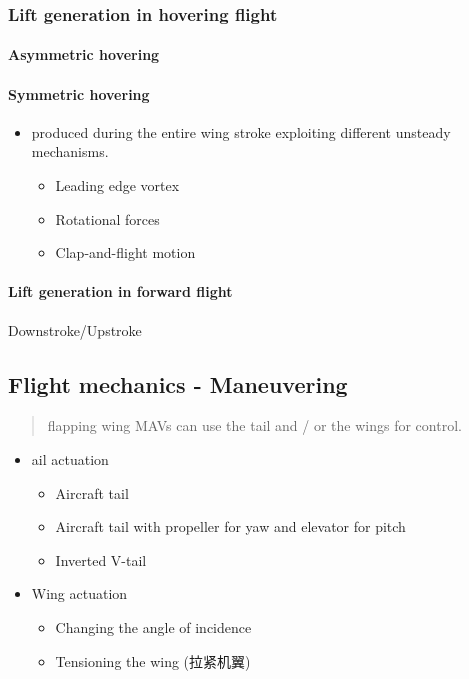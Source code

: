 \documentclass[]{article}
\let\oldparagraph\paragraph
\renewcommand{\paragraph}[1]{\oldparagraph{#1}\mbox{}}
\begin{document}
\subsubsection{Lift generation in hovering flight}\label{header-n1629}

\paragraph{Asymmetric hovering}\label{header-n1630}

\paragraph{Symmetric hovering}\label{header-n1631}

\begin{itemize}
\item
  produced during the entire wing stroke exploiting different unsteady
  mechanisms.

  \begin{itemize}
  \item
    Leading edge vortex
  \item
    Rotational forces
  \item
    Clap-and-flight motion
  \end{itemize}
\end{itemize}

\paragraph{Lift generation in forward flight}\label{header-n1642}

Downstroke/Upstroke

\subsection{Flight mechanics - Maneuvering}\label{header-n1644}

\begin{quote}
flapping wing MAVs can use the tail and / or the wings for control.
\end{quote}

\begin{itemize}
\item
  ail actuation

  \begin{itemize}
  \item
    Aircraft tail
  \item
    Aircraft tail with propeller for yaw and elevator for pitch
  \item
    Inverted V-tail
  \end{itemize}
\item
  Wing actuation

  \begin{itemize}
  \item
    Changing the angle of incidence
  \item
    Tensioning the wing (拉紧机翼)
  \end{itemize}
\end{itemize}
\end{document}
